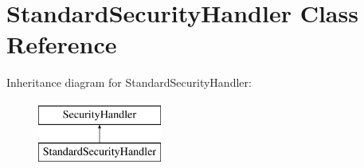\hypertarget{class_standard_security_handler}{}\section{Standard\+Security\+Handler Class Reference}
\label{class_standard_security_handler}
Inheritance diagram for Standard\+Security\+Handler\+:\begin{figure}[H]
\begin{center}
\leavevmode
\includegraphics[height=2.000000cm]{class_standard_security_handler}
\end{center}
\end{figure}
